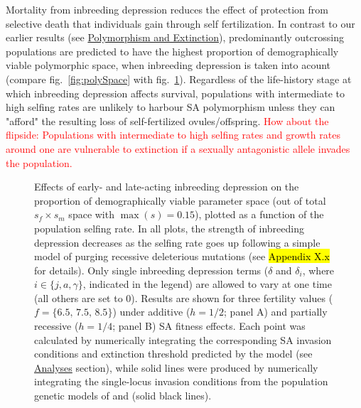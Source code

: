 \documentclass[11pt]{article}
\begin{document}
Mortality from inbreeding depression reduces the effect of protection from selective death that individuals gain through self fertilization. In contrast to our earlier results (see \hyperref[subsec:PolyExt]{Polymorphism and Extinction}), predominantly outcrossing populations are predicted to have the highest proportion of demographically viable polymorphic space, when inbreeding depression is taken into acount (compare fig.~\ref{fig:polySpace} with fig.~\ref{fig:deltaPolySpace}). Regardless of the life-history stage at which inbreeding depression affects survival, populations with intermediate to high selfing rates are unlikely to harbour SA polymorphism unless they can "afford" the resulting loss of self-fertilized ovules/offspring. \textcolor{red}{How about the flipside: Populations with intermediate to high selfing rates and growth rates around one are vulnerable to extinction if a sexually antagonistic allele invades the population.  }


 \begin{figure}[htbp]
 \centering
 \caption{\footnotesize{Effects of early- and late-acting inbreeding depression on the proportion of demographically viable parameter space (out of total $s_f \times s_m$ space with $\max(s) = 0.15$), plotted as a function of the population selfing rate. In all plots, the strength of inbreeding depression decreases as the selfing rate goes up following a simple model of purging recessive deleterious mutations (see \hl{Appendix X.x} for details). Only single inbreeding depression terms ($\delta$ and $\delta_i$, where $i \in \{j,a,\gamma\}$, indicated in the legend) are allowed to vary at one time (all others are set to $0$). Results are shown for three fertility values ($f = \{6.5,\,7.5,\,8.5\}$) under additive ($h = 1/2$; panel A) and partially recessive ($h = 1/4$; panel B) SA fitness effects. Each point was calculated by numerically integrating the corresponding SA invasion conditions and extinction threshold predicted by the model (see \hyperref[subsec:analyses]{Analyses} section), while solid lines were produced by numerically integrating the single-locus invasion conditions from the population genetic models of \citet{JordanConnallon2014} and \citet{Olito2017} (solid black lines).}} 
 \label{fig:deltaPolySpace}
 \end{figure}
\end{document}
